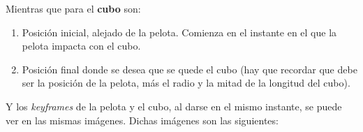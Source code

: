 \documentclass{article}
\begin{document}
\bigskip






Mientras que para el \textbf{cubo} son:

\begin{enumerate}
    \item Posición inicial, alejado de la pelota. Comienza en el instante en el que la pelota impacta con el cubo.
    \item Posición final donde se desea que se quede el cubo (hay que recordar que debe ser la posición de la pelota, más el radio y la mitad de la longitud del cubo).
\end{enumerate}

Y los \textit{keyframes} de la pelota y el cubo, al darse en el mismo instante, se puede ver en las mismas imágenes. Dichas imágenes son las siguientes:

\end{document}
